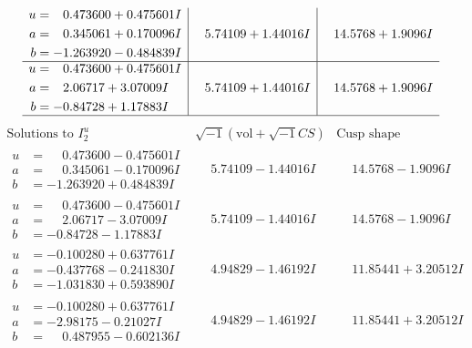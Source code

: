 \documentclass[1p]{elsarticle_modified}
\theoremstyle{definition}
\newcommand{\I}{\sqrt{-1}}
\begin{document}
$$\begin{array}{c|c|c}
\begin{aligned}
u &= \phantom{-}0.473600 + 0.475601 I \\
a &= \phantom{-}0.345061 + 0.170096 I \\
b &= -1.263920 - 0.484839 I\end{aligned}
 & \phantom{-}5.74109 + 1.44016 I & \phantom{-}14.5768 + 1.9096 I \\ \hline\begin{aligned}
u &= \phantom{-}0.473600 + 0.475601 I \\
a &= \phantom{-}2.06717 + 3.07009 I \\
b &= -0.84728 + 1.17883 I\end{aligned}
 & \phantom{-}5.74109 + 1.44016 I & \phantom{-}14.5768 + 1.9096 I\\
 \hline 
 \end{array}$$\newpage$$\begin{array}{c|c|c}  
\text{Solutions to }I^u_{2}& \I (\text{vol} + \sqrt{-1}CS) & \text{Cusp shape}\\
 \hline 
\begin{aligned}
u &= \phantom{-}0.473600 - 0.475601 I \\
a &= \phantom{-}0.345061 - 0.170096 I \\
b &= -1.263920 + 0.484839 I\end{aligned}
 & \phantom{-}5.74109 - 1.44016 I & \phantom{-}14.5768 - 1.9096 I \\ \hline\begin{aligned}
u &= \phantom{-}0.473600 - 0.475601 I \\
a &= \phantom{-}2.06717 - 3.07009 I \\
b &= -0.84728 - 1.17883 I\end{aligned}
 & \phantom{-}5.74109 - 1.44016 I & \phantom{-}14.5768 - 1.9096 I \\ \hline\begin{aligned}
u &= -0.100280 + 0.637761 I \\
a &= -0.437768 - 0.241830 I \\
b &= -1.031830 + 0.593890 I\end{aligned}
 & \phantom{-}4.94829 - 1.46192 I & \phantom{-}11.85441 + 3.20512 I \\ \hline\begin{aligned}
u &= -0.100280 + 0.637761 I \\
a &= -2.98175 - 0.21027 I \\
b &= \phantom{-}0.487955 - 0.602136 I\end{aligned}
 & \phantom{-}4.94829 - 1.46192 I & \phantom{-}11.85441 + 3.20512 I \\ \hline\begin{aligned}

\end{aligned}
\end{array}$$
\end{document}
